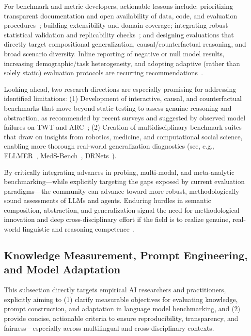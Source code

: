 \documentclass[sigconf]{acmart}
\begin{document}
For benchmark and metric developers, actionable lessons include: prioritizing transparent documentation and open availability of data, code, and evaluation procedures~\cite{ref94, ref95, ref55}; building extensibility and domain coverage; integrating robust statistical validation and replicability checks~\cite{ref22, ref61}; and designing evaluations that directly target compositional generalization, causal/counterfactual reasoning, and broad scenario diversity. Inline reporting of negative or null model results, increasing demographic/task heterogeneity, and adopting adaptive (rather than solely static) evaluation protocols are recurring recommendations~\cite{ref55, ref61, ref63, ref64, ref94}.

Looking ahead, two research directions are especially promising for addressing identified limitations:
(1) Development of interactive, causal, and counterfactual benchmarks that move beyond static testing to assess genuine reasoning and abstraction, as recommended by recent surveys and suggested by observed model failures on TWT and ARC~\cite{ref92, ref96};
(2) Creation of multidisciplinary benchmark suites that draw on insights from robotics, medicine, and computational social science, enabling more thorough real-world generalization diagnostics (see, e.g., ELLMER~\cite{ref37}, MedS-Bench~\cite{ref95}, DRNets~\cite{ref89}).

By critically integrating advances in probing, multi-modal, and meta-analytic benchmarking---while explicitly targeting the gaps exposed by current evaluation paradigms---the community can advance toward more robust, methodologically sound assessments of LLMs and agents. Enduring hurdles in semantic composition, abstraction, and generalization signal the need for methodological innovation and deep cross-disciplinary effort if the field is to realize genuine, real-world linguistic and reasoning competence~\cite{ref92, ref94, ref96, ref97, ref98, ref99}.

\subsection{Knowledge Measurement, Prompt Engineering, and Model Adaptation}

This subsection directly targets empirical AI researchers and practitioners, explicitly aiming to (1) clarify measurable objectives for evaluating knowledge, prompt construction, and adaptation in language model benchmarking, and (2) provide concise, actionable criteria to ensure reproducibility, transparency, and fairness—especially across multilingual and cross-disciplinary contexts.
\end{document}
